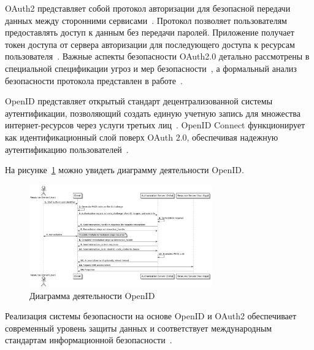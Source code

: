 OAuth2 представляет собой протокол авторизации для безопасной передачи данных между сторонними сервисами~\cite{richer2017}.
Протокол позволяет пользователям предоставлять доступ к данным без передачи паролей. Приложение получает токен доступа от сервера авторизации для последующего доступа к ресурсам пользователя~\cite{18_hardt2012}.
Важные аспекты безопасности OAuth2.0 детально рассмотрены в специальной спецификации угроз и мер безопасности~\cite{lodderstedt2013}, а формальный анализ безопасности протокола представлен в работе~\cite{fett2016}.

OpenID представляет открытый стандарт децентрализованной системы аутентификации, позволяющий создать единую учетную запись для множества интернет-ресурсов через услуги третьих лиц~\cite{19_weingartner2017,sakimura2015}.
OpenID Connect функционирует как идентификационный слой поверх OAuth 2.0, обеспечивая надежную аутентификацию пользователей~\cite{openid_foundation2014}.

На рисунке~\ref{fig:openid_diagram} можно увидеть диаграмму деятельности OpenID.
\begin{figure}[htbp]
    \centering
    \includegraphics[width=0.7\textwidth]{Dissertation/images/openId_scheme}
    \caption{Диаграмма деятельности OpenID}
    \label{fig:openid_diagram}
\end{figure}

Реализация системы безопасности на основе OpenID и OAuth2 обеспечивает современный уровень защиты данных и соответствует международным стандартам информационной безопасности~\cite{fett2016,19_weingartner2017}.
